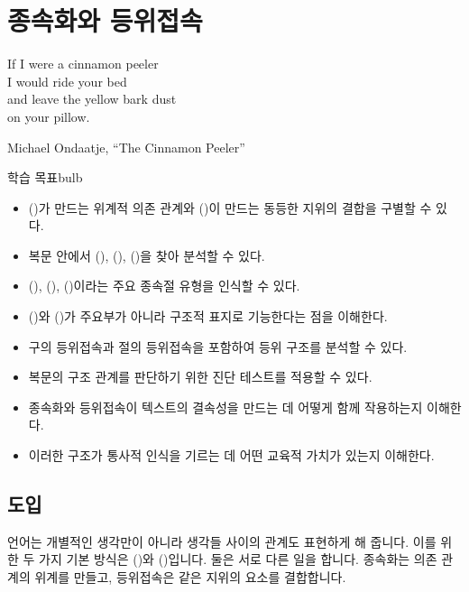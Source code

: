 \chapter{종속화와 등위접속} \label{ch:subord-coord-ko}

\epigraph{If I were a cinnamon peeler\\
I would ride your bed\\
and leave the yellow bark dust\\
on your pillow.}{Michael Ondaatje, \enquote{The Cinnamon Peeler}}

\begin{tblsframedsymbol}{학습 목표}{bulb}
\begin{itemize}[noitemsep, leftmargin=*]
    \item {}()가 만드는 위계적 의존 관계와 ()이 만드는 동등한 지위의 결합을 구별할 수 있다.
    \item 복문 안에서 (), (), ()을 찾아 분석할 수 있다.
    \item {}(), (), ()이라는 주요 종속절 유형을 인식할 수 있다.
    \item {}()와 ()가 주요부가 아니라 구조적 표지로 기능한다는 점을 이해한다.
    \item 구의 등위접속과 절의 등위접속을 포함하여 등위 구조를 분석할 수 있다.
    \item 복문의 구조 관계를 판단하기 위한 진단 테스트를 적용할 수 있다.
    \item 종속화와 등위접속이 텍스트의 결속성을 만드는 데 어떻게 함께 작용하는지 이해한다.
    \item 이러한 구조가 통사적 인식을 기르는 데 어떤 교육적 가치가 있는지 이해한다.
\end{itemize}
\end{tblsframedsymbol}

\section{도입}

언어는 개별적인 생각만이 아니라 생각들 사이의 관계도 표현하게 해 줍니다. 이를 위한 두 가지 기본 방식은 ()와 ()입니다. 둘은 서로 다른 일을 합니다. 종속화는 의존 관계의 위계를 만들고, 등위접속은 같은 지위의 요소를 결합합니다.


